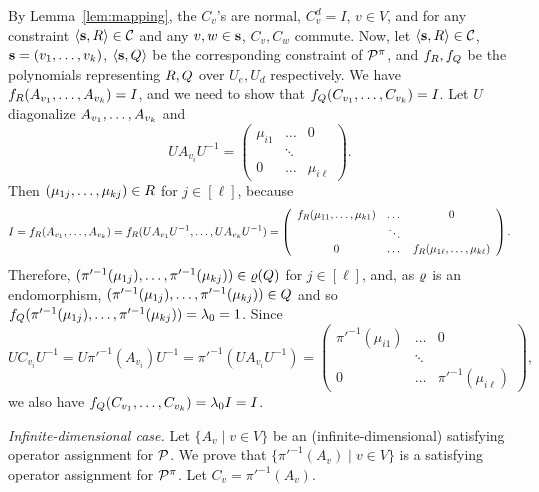 \documentclass[11pt,letter]{article}
\begin{document}
By Lemma~\ref{lem:mapping}, the $C_v$'s are normal, $C_v^d=I$, $v\in V$,
and for any constraint $\langle {\bf s},R \rangle\in{\mathcal C}$ and any $v,w\in{\bf s}$, $C_v,C_w$ commute.
Now, let $\langle {\bf s},R \rangle\in{\mathcal C}$, ${\bf s}=(v _1,\ldots, v _{k})$, $\langle {\bf s},Q \rangle$ be the
corresponding constraint of ${\mathcal P}^\pi$, and $f_R,f_Q$ be the polynomials representing $R,Q$ over $U_e,U_d$ respectively. We have $f_R(A_{v_1},\ldots, A_{v_k})=I$, and we need to show that $f_Q(C_{v_1},\ldots, C_{v_k})=I$. Let $U$ diagonalize $A_{v_1},\ldots, A_{v_k}$ and
\[
UA_{v_i}U^{-1}=\left(\begin{array}{ccc}\mu_{i1}&\dots&0\\ &\ddots&\\ 0&\dots&\mu_{i\ell}\end{array}\right).
\]
Then $(\mu_{1j},\ldots,\mu_{kj})\in R$ for $j\in[\ell]$, because
\[
I=f_R(A_{v_1},\ldots, A_{v_k})=f_R(UA_{v_1}U^{-1},\ldots, UA_{v_k}U^{-1})= \left(\begin{array}{ccc}f_R(\mu_{11},\ldots,\mu_{k1})&\dots&0\\ &\ddots&\\ 0&\dots&f_R(\mu_{1\ell},\ldots,\mu_{k\ell})\end{array}\right).
\]
Therefore, $(\pi'^{-1}(\mu_{1j}),\ldots,\pi'^{-1}(\mu_{kj}))\in\varrho(Q)$ for $j\in[\ell]$, and, as $\varrho$ is an endomorphism, $(\pi'^{-1}(\mu_{1j}),\ldots,\pi'^{-1}(\mu_{kj}))\in Q$ and so $f_Q(\pi'^{-1}(\mu_{1j}),\ldots,\pi'^{-1}(\mu_{kj}))=\lambda_0=1$. Since 
\[
UC_{v_i}U^{-1}=U\pi'^{-1}(A_{v_i})U^{-1}=\pi'^{-1}(UA_{v_i}U^{-1})=\left(\begin{array}{ccc}\pi'^{-1}(\mu_{i1})&\dots&0\\ &\ddots&\\ 0&\dots&\pi'^{-1}(\mu_{i\ell})\end{array}\right),
\]
we also have $f_Q(C_{v_1},\ldots, C_{v_k})=\lambda_0I=I$.

{\it Infinite-dimensional case.}
Let $\{A_v\mid v\in V\}$ be an (infinite-dimensional) satisfying operator assignment for ${\mathcal P}$. We prove that $\{\pi'^{-1}(A_v)\mid v\in V\}$ is a satisfying operator assignment for ${\mathcal P}^\pi$. Let $C_v=\pi'^{-1}(A_v)$.
\end{document}
